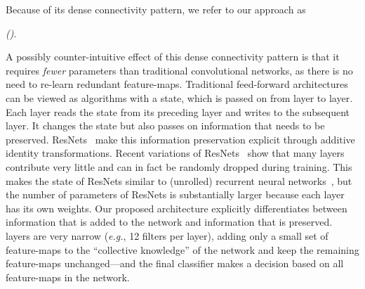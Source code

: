Because of its dense connectivity pattern, we refer to our approach as {\emph{\methodnamecap{} (\methodnameshort{})}.

A possibly counter-intuitive effect of this dense connectivity pattern is that it requires \emph{fewer} parameters than traditional convolutional networks, as there is no need to re-learn redundant feature-maps.
Traditional feed-forward architectures can be viewed as algorithms with a state, which is passed on from layer to layer. Each layer reads the state from its preceding layer and writes to the subsequent layer. It changes the state but also passes on information that needs to be preserved. ResNets~\cite{resnet} make this information preservation explicit through additive identity transformations.
Recent variations of ResNets~\cite{stochastic} show that many layers contribute very little and can in fact be randomly dropped during training. This makes the state of ResNets similar to (unrolled) recurrent neural networks~\cite{liao2016bridging}, but the number of parameters of ResNets is substantially larger because each layer has its own weights.
Our proposed \methodnameshort{} architecture explicitly differentiates between information that is added to the network and information that is preserved.
\methodnameshort{} layers are very narrow (\emph{e.g.}, 12 filters per layer), adding only a small set of feature-maps to the ``collective knowledge'' of the network and keep the remaining feature-maps unchanged---and the final classifier makes a decision based on all feature-maps in the network.




}
